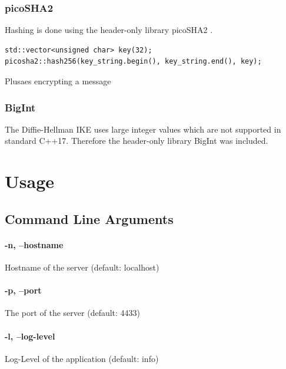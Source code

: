 \documentclass[12pt, letterpaper]{article}
\newenvironment{code}{\captionsetup{type=listing}}{}
\begin{document}
\subsubsection{picoSHA2}
Hashing is done using the header-only library picoSHA2 \cite{picosha}.

\begin{code}
	\begin{verbatim}
std::vector<unsigned char> key(32);
picosha2::hash256(key_string.begin(), key_string.end(), key);
	\end{verbatim}
	\caption{Plusaes encrypting a message}
	\label{picosha2}
\end{code}

\subsubsection{BigInt}
The Diffie-Hellman IKE uses large integer values which are not supported in standard C++17. Therefore the header-only library BigInt \cite{bigint} was included.

\pagebreak

\section{Usage}
\label{usage}

\subsection{Command Line Arguments}

\paragraph{-n, --hostname}
Hostname of the server (default: localhost)


\paragraph{-p, --port}
The port of the server (default: 4433)

\paragraph{-l, --log-level}
Log-Level of the application (default: info)
\end{document}
